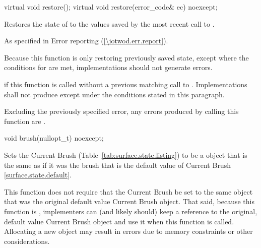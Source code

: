 \begin{itemdecl}
virtual void restore();
virtual void restore(error_code& ec) noexcept;
\end{itemdecl}
\begin{itemdescr}
\pnum
\effects
Restores the state of  to the values saved by the most recent call to .

\pnum
\throws
As specified in Error reporting (\ref{\iotwod.err.report}).

\remarks
\pnum
Because this function is only restoring previously saved state, except where the conditions for  are met, implementations should not generate errors.

\pnum
\errors
{} if this function is called without a previous matching call to . Implementations shall not produce  except under the conditions stated in this paragraph.

\pnum
Excluding the previously specified error, any errors produced by calling this function are .
\end{itemdescr}

\begin{itemdecl}
void brush(nullopt_t) noexcept;
\end{itemdecl}
\begin{itemdescr}
\pnum
\effects
Sets the Current Brush (Table~\ref{tab:surface.state.listing}) to be a  object that is the same as if it was the brush that is the default value of Current Brush \ref{surface.state.default}.

\pnum
\enternote
This function does not require that the Current Brush be set to the same  object that was the original default value Current Brush  object. That said, because this function is , implementers can (and likely should) keep a reference to the original, default value Current Brush  object and use it when this function is called. Allocating a new  object may result in errors due to memory constraints or other considerations.
\exitnote
\end{itemdescr}


